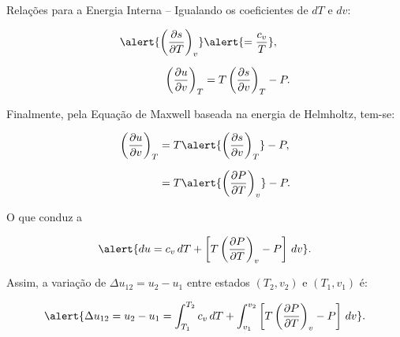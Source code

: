 \begin{frame}[allowframebreaks]{Relações para a Energia Interna --}
        \pagebreak
        Igualando os coeficientes de \alert{$dT$} e \alert{$dv$}:

        \begin{align*}
            \alert{\left(\frac{\partial s}{\partial T}\right)_v}
            &\alert{= \frac{c_v}{T}},
            \\[\medskipamount]
            \left(\frac{\partial u}{\partial v}\right)_T
            &= T\left(\frac{\partial s}{\partial v}\right)_T - P.
        \end{align*}

        \pagebreak
        Finalmente, pela Equação de Maxwell baseada na energia de Helmholtz, tem-se:

        \begin{align*}
            \left(\frac{\partial u}{\partial v}\right)_T
            &= T\alert{\left(\frac{\partial s}{\partial v}\right)_T} - P,
            \\[\medskipamount]
            &= T\alert{\left(\frac{\partial P}{\partial T}\right)_v} - P.
        \end{align*}

        O que conduz a

        \begin{equation*}
            \alert{
                du = c_v\,dT +
                \left[
                    T\left(
                        \frac{\partial P}{\partial T}
                    \right)_v - P
                \right]\,dv
            }.
        \end{equation*}

        \pagebreak
        Assim, a variação de \alert{$\Delta u_{12} = u_2 - u_1$} entre estados \alert{$(T_2,
        v_2)$} e \alert{$(T_1, v_1)$} é: \vspace*\bigskipamount

        \begin{equation*}
            \alert{
                \Delta u_{12} = u_2 - u_1 =
                    \int_{T_1}^{T_2}
                        c_v\,dT +
                    \int_{v_1}^{v_2}
                        \left[
                            T\left(
                                \frac{\partial P}{\partial T}
                            \right)_v - P
                        \right]\,dv
            }.
        \end{equation*}

    \end{frame}

